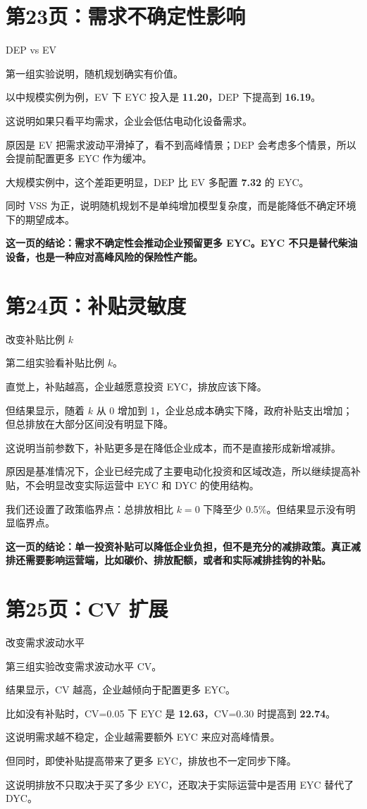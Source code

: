 \documentclass[UTF8,zihao=false,12pt]{ctexart}
\newcommand{\slide}[2]{%
  \section*{#1}
  {\color{muted}#2}\par
  \vspace{0.4em}
}
\begin{document}
\slide{第23页：需求不确定性影响}{DEP vs EV}

第一组实验说明，随机规划确实有价值。

以中规模实例为例，EV 下 EYC 投入是 \textbf{11.20}，DEP 下提高到 \textbf{16.19}。

这说明如果只看平均需求，企业会低估电动化设备需求。

原因是 EV 把需求波动平滑掉了，看不到高峰情景；DEP 会考虑多个情景，所以会提前配置更多 EYC 作为缓冲。

大规模实例中，这个差距更明显，DEP 比 EV 多配置 \textbf{7.32} 的 EYC。

同时 VSS 为正，说明随机规划不是单纯增加模型复杂度，而是能降低不确定环境下的期望成本。

\textbf{这一页的结论：需求不确定性会推动企业预留更多 EYC。EYC 不只是替代柴油设备，也是一种应对高峰风险的保险性产能。}

\newpage

\slide{第24页：补贴灵敏度}{改变补贴比例 $k$}

第二组实验看补贴比例 $k$。

直觉上，补贴越高，企业越愿意投资 EYC，排放应该下降。

但结果显示，随着 $k$ 从 0 增加到 1，企业总成本确实下降，政府补贴支出增加；但总排放在大部分区间没有明显下降。

这说明当前参数下，补贴更多是在降低企业成本，而不是直接形成新增减排。

原因是基准情况下，企业已经完成了主要电动化投资和区域改造，所以继续提高补贴，不会明显改变实际运营中 EYC 和 DYC 的使用结构。

我们还设置了政策临界点：总排放相比 $k=0$ 下降至少 0.5\%。但结果显示没有明显临界点。

\textbf{这一页的结论：单一投资补贴可以降低企业负担，但不是充分的减排政策。真正减排还需要影响运营端，比如碳价、排放配额，或者和实际减排挂钩的补贴。}

\newpage

\slide{第25页：CV 扩展}{改变需求波动水平}

第三组实验改变需求波动水平 CV。

结果显示，CV 越高，企业越倾向于配置更多 EYC。

比如没有补贴时，CV=0.05 下 EYC 是 \textbf{12.63}，CV=0.30 时提高到 \textbf{22.74}。

这说明需求越不稳定，企业越需要额外 EYC 来应对高峰情景。

但同时，即使补贴提高带来了更多 EYC，排放也不一定同步下降。

这说明排放不只取决于买了多少 EYC，还取决于实际运营中是否用 EYC 替代了 DYC。
\end{document}
